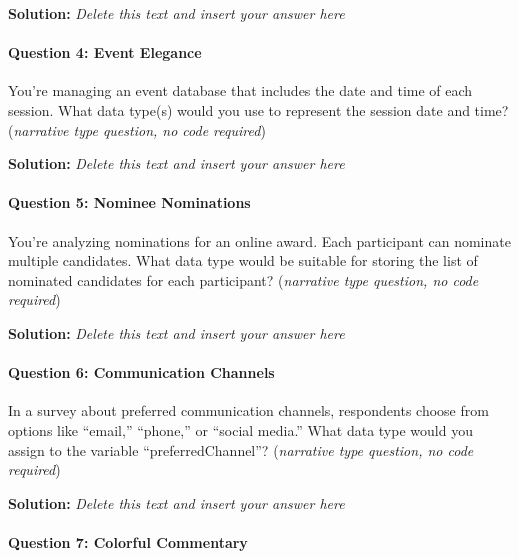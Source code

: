 \documentclass[
]{article}
\begin{document}
\textbf{Solution:} \emph{Delete this text and insert your answer here}

\hypertarget{question-4-event-elegance}{%
\paragraph{Question 4: Event Elegance}\label{question-4-event-elegance}}

You're managing an event database that includes the date and time of
each session. What data type(s) would you use to represent the session
date and time? (\emph{narrative type question, no code required})

\textbf{Solution:} \emph{Delete this text and insert your answer here}

\hypertarget{question-5-nominee-nominations}{%
\paragraph{Question 5: Nominee
Nominations}\label{question-5-nominee-nominations}}

You're analyzing nominations for an online award. Each participant can
nominate multiple candidates. What data type would be suitable for
storing the list of nominated candidates for each participant?
(\emph{narrative type question, no code required})

\textbf{Solution:} \emph{Delete this text and insert your answer here}

\hypertarget{question-6-communication-channels}{%
\paragraph{Question 6: Communication
Channels}\label{question-6-communication-channels}}

In a survey about preferred communication channels, respondents choose
from options like ``email,'' ``phone,'' or ``social media.'' What data
type would you assign to the variable ``preferredChannel''?
(\emph{narrative type question, no code required})

\textbf{Solution:} \emph{Delete this text and insert your answer here}

\hypertarget{question-7-colorful-commentary}{%
\paragraph{Question 7: Colorful
Commentary}\label{question-7-colorful-commentary}}
\end{document}
